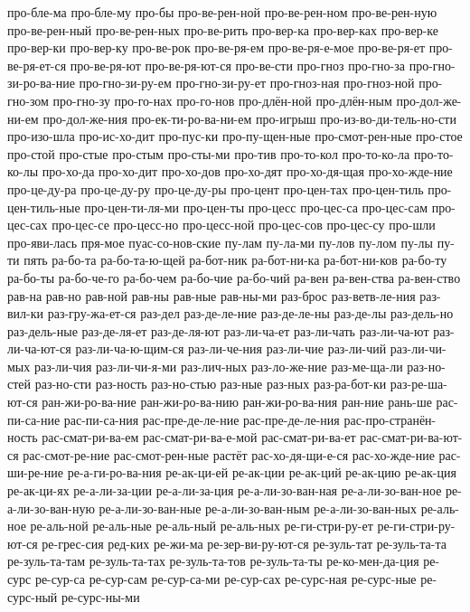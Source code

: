 {про-бле-ма
про-бле-му
про-бы
про-ве-рен-ной
про-ве-рен-ном
про-ве-рен-ную
про-ве-рен-ный
про-ве-рен-ных
про-ве-рить
про-вер-ка
про-вер-ках
про-вер-ке
про-вер-ки
про-вер-ку
про-ве-рок
про-ве-ря-ем
про-ве-ря-е-мое
про-ве-ря-ет
про-ве-ря-ет-ся
про-ве-ря-ют
про-ве-ря-ют-ся
про-ве-сти
про-гноз
про-гно-за
про-гно-зи-ро-ва-ние
про-гно-зи-ру-ем
про-гно-зи-ру-ет
про-гноз-ная
про-гноз-ной
про-гно-зом
про-гно-зу
про-го-нах
про-го-нов
про-длён-ной
про-длён-ным
про-дол-же-ни-ем
про-дол-же-ния
про-ек-ти-ро-ва-ни-ем
про-игрыш
про-из-во-ди-тель-но-сти
про-изо-шла
про-ис-хо-дит
про-пус-ки
про-пу-щен-ные
про-смот-рен-ные
про-стое
про-стой
про-стые
про-стым
про-сты-ми
про-тив
про-то-кол
про-то-ко-ла
про-то-ко-лы
про-хо-да
про-хо-дит
про-хо-дов
про-хо-дят
про-хо-дя-щая
про-хо-жде-ние
про-це-ду-ра
про-це-ду-ру
про-це-ду-ры
про-цент
про-цен-тах
про-цен-тиль
про-цен-тиль-ные
про-цен-ти-ля-ми
про-цен-ты
про-цесс
про-цес-са
про-цес-сам
про-цес-сах
про-цес-се
про-цесс-но
про-цесс-ной
про-цес-сов
про-цес-су
про-шли
про-яви-лась
пря-мое
пуас-со-нов-ские
пу-лам
пу-ла-ми
пу-лов
пу-лом
пу-лы
пу-ти
пять
ра-бо-та
ра-бо-та-ю-щей
ра-бот-ник
ра-бот-ни-ка
ра-бот-ни-ков
ра-бо-ту
ра-бо-ты
ра-бо-че-го
ра-бо-чем
ра-бо-чие
ра-бо-чий
ра-вен
ра-вен-ства
ра-вен-ство
рав-на
рав-но
рав-ной
рав-ны
рав-ные
рав-ны-ми
раз-брос
раз-ветв-ле-ния
раз-вил-ки
раз-гру-жа-ет-ся
раз-дел
раз-де-ле-ние
раз-де-ле-ны
раз-де-лы
раз-дель-но
раз-дель-ные
раз-де-ля-ет
раз-де-ля-ют
раз-ли-ча-ет
раз-ли-чать
раз-ли-ча-ют
раз-ли-ча-ют-ся
раз-ли-ча-ю-щим-ся
раз-ли-че-ния
раз-ли-чие
раз-ли-чий
раз-ли-чи-мых
раз-ли-чия
раз-ли-чи-я-ми
раз-лич-ных
раз-ло-же-ние
раз-ме-ща-ли
раз-но-стей
раз-но-сти
раз-ность
раз-но-стью
раз-ные
раз-ных
раз-ра-бот-ки
раз-ре-ша-ют-ся
ран-жи-ро-ва-ние
ран-жи-ро-ва-нию
ран-жи-ро-ва-ния
ран-ние
рань-ше
рас-пи-са-ние
рас-пи-са-ния
рас-пре-де-ле-ние
рас-пре-де-ле-ния
рас-про-странён-ность
рас-смат-ри-ва-ем
рас-смат-ри-ва-е-мой
рас-смат-ри-ва-ет
рас-смат-ри-ва-ют-ся
рас-смот-ре-ние
рас-смот-рен-ные
растёт
рас-хо-дя-щи-е-ся
рас-хо-жде-ние
рас-ши-ре-ние
ре-а-ги-ро-ва-ния
ре-ак-ци-ей
ре-ак-ции
ре-ак-ций
ре-ак-цию
ре-ак-ция
ре-ак-ци-ях
ре-а-ли-за-ции
ре-а-ли-за-ция
ре-а-ли-зо-ван-ная
ре-а-ли-зо-ван-ное
ре-а-ли-зо-ван-ную
ре-а-ли-зо-ван-ные
ре-а-ли-зо-ван-ным
ре-а-ли-зо-ван-ных
ре-аль-ное
ре-аль-ной
ре-аль-ные
ре-аль-ный
ре-аль-ных
ре-ги-стри-ру-ет
ре-ги-стри-ру-ют-ся
ре-грес-сия
ред-ких
ре-жи-ма
ре-зер-ви-ру-ют-ся
ре-зуль-тат
ре-зуль-та-та
ре-зуль-та-там
ре-зуль-та-тах
ре-зуль-та-тов
ре-зуль-та-ты
ре-ко-мен-да-ция
ре-сурс
ре-сур-са
ре-сур-сам
ре-сур-са-ми
ре-сур-сах
ре-сурс-ная
ре-сурс-ные
ре-сурс-ный
ре-сурс-ны-ми
}
